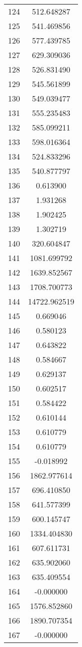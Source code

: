 \documentclass[12pt]{article}
\begin{document}
\begin{longtable}{@{}cc@{}}
124 & 512.648287 \\
125 & 541.469856 \\
126 & 577.439785 \\
127 & 629.309036 \\
128 & 526.831490 \\
129 & 545.561899 \\
130 & 549.039477 \\
131 & 555.235483 \\
132 & 585.099211 \\
133 & 598.016364 \\
134 & 524.833296 \\
135 & 540.877797 \\
136 & 0.613900 \\
137 & 1.931268 \\
138 & 1.902425 \\
139 & 1.302719 \\
140 & 320.604847 \\
141 & 1081.699792 \\
142 & 1639.852567 \\
143 & 1708.700773 \\
144 & 14722.962519 \\
145 & 0.669046 \\
146 & 0.580123 \\
147 & 0.643822 \\
148 & 0.584667 \\
149 & 0.629137 \\
150 & 0.602517 \\
151 & 0.584422 \\
152 & 0.610144 \\
153 & 0.610779 \\
154 & 0.610779 \\
155 & -0.018992 \\
156 & 1862.977614 \\
157 & 696.410850 \\
158 & 641.577399 \\
159 & 600.145747 \\
160 & 1334.404830 \\
161 & 607.611731 \\
162 & 635.902060 \\
163 & 635.409554 \\
164 & -0.000000 \\
165 & 1576.852860 \\
166 & 1890.707354 \\
167 & -0.000000 \\

\end{longtable}
\end{document}
